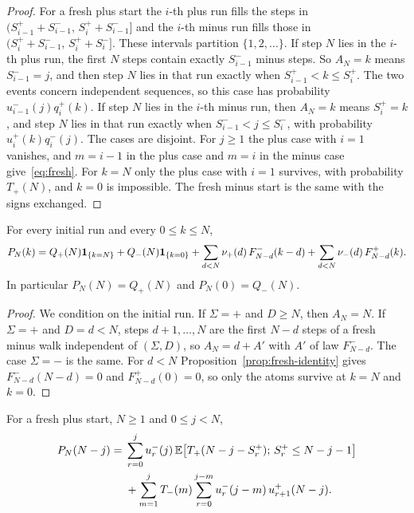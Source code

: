 \begin{proof}
For a fresh plus start the $i$-th plus run fills the steps in
$(S^\plus_{i-1}+S^\minus_{i-1},\,S^\plus_i+S^\minus_{i-1}]$ and the $i$-th minus run
fills those in $(S^\plus_i+S^\minus_{i-1},\,S^\plus_i+S^\minus_i]$. These intervals
partition $\{1,2,\dots\}$. If step $N$ lies in the $i$-th plus run, the first $N$
steps contain exactly $S^\minus_{i-1}$ minus steps. So $A_N=k$ means
$S^\minus_{i-1}=j$, and then step $N$ lies in that run exactly when
$S^\plus_{i-1}<k\le S^\plus_i$. The two events concern independent sequences, so
this case has probability $u^\minus_{i-1}(j)q^\plus_i(k)$. If step $N$ lies in the
$i$-th minus run, then $A_N=k$ means $S^\plus_i=k$, and step $N$ lies in that run
exactly when $S^\minus_{i-1}<j\le S^\minus_i$, with probability
$u^\plus_i(k)q^\minus_i(j)$. The cases are disjoint. For $j\ge1$ the plus case with
$i=1$ vanishes, and $m=i-1$ in the plus case and $m=i$ in the minus case
give~\eqref{eq:fresh}. For $k=N$ only the plus case with $i=1$ survives, with
probability $T_\plus(N)$, and $k=0$ is impossible. The fresh minus start is the same
with the signs exchanged.
\end{proof}

\begin{proposition}\label{prop:first-run}
For every initial run and every $0\le k\le N$,
\[
 P_N(k)=Q_{+}(N)\mathbf{1}_{\{k=N\}}+Q_{-}(N)\mathbf{1}_{\{k=0\}}
 +\sum_{d<N}\nu_{+}(d)\,F^{-}_{N-d}(k-d)+\sum_{d<N}\nu_{-}(d)\,F^{+}_{N-d}(k).
\]
In particular $P_N(N)=Q_\plus(N)$ and $P_N(0)=Q_\minus(N)$.
\end{proposition}

\begin{proof}
We condition on the initial run. If $\Sigma=\plus$ and $D\ge N$, then $A_N=N$. If
$\Sigma=\plus$ and $D=d<N$, steps $d+1,\dots,N$ are the first $N-d$ steps of a fresh
minus walk independent of $(\Sigma,D)$, so $A_N=d+A'$ with $A'$ of law
$F^\minus_{N-d}$. The case $\Sigma=\minus$ is the same. For $d<N$
Proposition~\ref{prop:fresh-identity} gives $F^\minus_{N-d}(N-d)=0$ and
$F^\plus_{N-d}(0)=0$, so only the atoms survive at $k=N$ and $k=0$.
\end{proof}

\begin{proposition}\label{prop:final-run}
For a fresh plus start, $N\ge1$ and $0\le j<N$,
\begin{equation}\label{eq:final-explicit}
\begin{split}
 P_N(N-j)={}&\sum_{r=0}^{j}u^{-}_r(j)\,\mathbb{E}\bigl[T_{+}(N-j-S^{+}_r);\,S^{+}_r\le N-j-1\bigr]\\
 &+\sum_{m=1}^{j}T_{-}(m)\sum_{r=0}^{j-m}u^{-}_r(j-m)\,u^{+}_{r+1}(N-j).
\end{split}
\end{equation}
\end{proposition}

